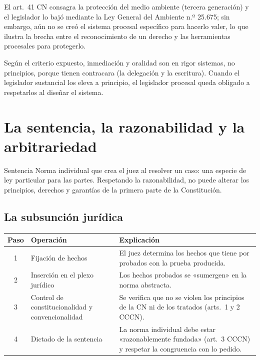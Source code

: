 \documentclass[12pt,oneside]{book}
\renewcommand{\arraystretch}{1.15}
\begin{document}
El art.~41 CN consagra la protección del medio ambiente (tercera generación) y el legislador lo bajó mediante la Ley General del Ambiente n.º 25.675; sin embargo, aún no se creó el sistema procesal específico para hacerlo valer, lo que ilustra la brecha entre el reconocimiento de un derecho y las herramientas procesales para protegerlo.

\begin{nota}
Según el criterio expuesto, inmediación y oralidad son en rigor sistemas, no principios, porque tienen contracara (la delegación y la escritura). Cuando el legislador sustancial los eleva a principio, el legislador procesal queda obligado a respetarlos al diseñar el sistema.
\end{nota}

\section{La sentencia, la razonabilidad y la arbitrariedad}

\begin{definicion}{Sentencia}
Norma individual que crea el juez al resolver un caso: una especie de ley particular para las partes. Respetando la razonabilidad, no puede alterar los principios, derechos y garantías de la primera parte de la Constitución.
\end{definicion}

\subsection{La subsunción jurídica}

\begin{table}[H]
\centering
\renewcommand{\arraystretch}{1.2}
\begin{tabularx}{\textwidth}{c>{\RaggedRight\arraybackslash}p{4cm}>{\RaggedRight\arraybackslash}X}
\toprule
\textbf{Paso} & \textbf{Operación} & \textbf{Explicación} \\
\midrule
1 & Fijación de hechos & El juez determina los hechos que tiene por probados con la prueba producida. \\
2 & Inserción en el plexo jurídico & Los hechos probados se «sumergen» en la norma abstracta. \\
3 & Control de constitucionalidad y convencionalidad & Se verifica que no se violen los principios de la CN ni de los tratados (arts.~1 y 2 CCCN). \\
4 & Dictado de la sentencia & La norma individual debe estar «razonablemente fundada» (art.~3 CCCN) y respetar la congruencia con lo pedido. \\
\bottomrule
\end{tabularx}
\end{table}
\end{document}
